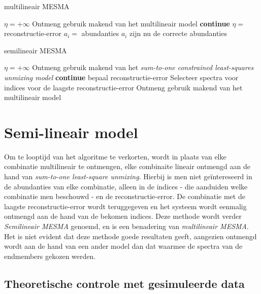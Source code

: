\documentclass[12pt]{report}
\begin{document}
\begin{algorithm}
\caption{multilineair MESMA\label{al:mmesma}}
\begin{algorithmic}[1]
\State $\eta = +\infty$ 
\State Ontmeng gebruik makend van het multilineair model
\State \textbf{continue}
\EndIf
{}
\State $\eta = $ reconstructie-error
\State $a_i = $ abundanties
\EndIf
\EndFor
\EndFor
\State $a_i$ zijn nu de correcte abundanties
\end{algorithmic}
\end{algorithm}

\begin{algorithm}
\caption{semilineair MESMA\label{al:smesma}}
\begin{algorithmic}[1]
\State $\eta = +\infty$ 
\State Ontmeng gebruik makend van het \textit{sum-to-one constrained least-squares unmixing model}
\State \textbf{continue}
\State bepaal reconstructie-error
\EndIf
\EndFor
\EndFor
\State Selecteer spectra voor indices voor de laagste reconstructie-error
\State Ontmeng gebruik makend van het multilineair model 
\end{algorithmic}
\end{algorithm}


\section{Semi-lineair model} \label{sec:smesma}

Om te looptijd van het algoritme te verkorten, wordt in plaats van elke combinatie multilineair te ontmengen, elke combinaite lineair ontmengd aan de hand van \textit{sum-to-one least-square unmixing}. Hierbij is men niet ge\"intereseerd in de abundanties van elke combinatie, alleen in de indices - die aanduiden welke combinatie men beschouwd - en de reconstructie-error. De combinatie met de laagste reconstructie-error wordt teruggegeven en het systeem wordt eenmalig ontmengd aan de hand van de bekomen indices. Deze methode wordt verder \textit{Semilineair MESMA} genoemd, en is een benadering van \textit{multilineair MESMA}. Het is niet evident dat deze methode goede resultaten geeft, aangezien ontmengd wordt aan de hand van een ander model dan dat waarmee de spectra van de endmembers gekozen werden.

\subsection{Theoretische controle met gesimuleerde data}
\end{document}
